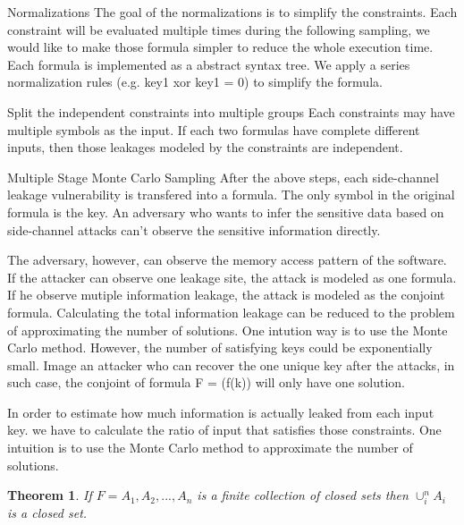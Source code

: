 Normalizations
The goal of the normalizations is to simplify the constraints. 
Each constraint will be evaluated multiple times during the following sampling, 
we would like to make those formula simpler to reduce the whole execution time.  
Each formula is implemented as a abstract syntax tree. We apply a series normalization
rules (e.g. key1 xor key1 = 0) to simplify the formula.


Split the independent constraints into multiple groups
Each constraints may have multiple symbols as the input. 
If each two formulas have complete different inputs,
then those leakages modeled by the constraints are independent. 

Multiple Stage Monte Carlo Sampling
After the above steps, each side-channel leakage vulnerability is 
transfered into a formula. The only symbol in the original formula is the key. 
An adversary who wants to infer the sensitive data based on side-channel 
attacks can’t observe the sensitive information directly. 

The adversary, however, can observe the memory access pattern of the software. 
If the attacker can observe one leakage site, the attack is modeled as one formula. 
If he observe mutiple information leakage, the attack is modeled as the conjoint formula.
Calculating the total information leakage can be reduced to the problem of approximating 
the number of solutions. One intution way is to use the Monte Carlo method. However, 
the number of satisfying keys could be exponentially small. Image an attacker 
who can recover the one unique key after the attacks, in such case, 
the conjoint of formula F = (f(k)) will only have one solution.

In order to estimate how much information is actually leaked from each input key.
we have to calculate the ratio of input that satisfies those constraints. 
One intuition is to use the Monte Carlo method to approximate the number of solutions.
\newtheorem{theorem}{Theorem}[section]

\begin{theorem}
      If $F={A_1,A_2,...,A_n}$ is a finite collection of closed sets then 
      $\cup_{i}^{n}A_i$ is a closed set.
\end{theorem}